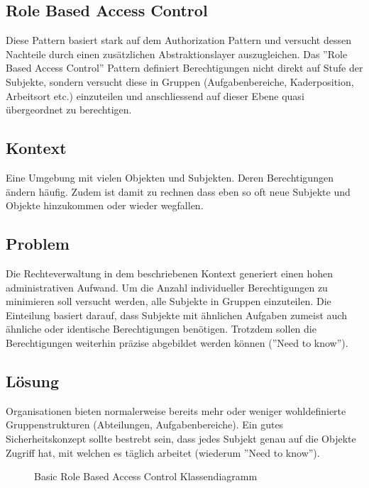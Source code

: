 \subsection{Role Based Access Control}
\label{sec:rbac}

Diese Pattern basiert stark auf dem Authorization Pattern und versucht dessen Nachteile durch einen zusätzlichen Abstraktionslayer auszugleichen.
Das ''Role Based Access Control'' Pattern definiert Berechtigungen nicht direkt auf Stufe der Subjekte, sondern versucht diese in Gruppen (Aufgabenbereiche, Kaderposition, Arbeitsort etc.) einzuteilen und anschliessend auf dieser Ebene quasi übergeordnet zu berechtigen.

\subsection*{Kontext}
Eine Umgebung mit vielen Objekten und Subjekten. Deren Berechtigungen ändern häufig. Zudem ist damit zu rechnen dass eben so oft neue Subjekte und Objekte hinzukommen oder wieder wegfallen.

\subsection*{Problem}
Die Rechteverwaltung in dem beschriebenen Kontext generiert einen hohen administrativen Aufwand. Um die Anzahl individueller Berechtigungen zu minimieren soll versucht werden, alle Subjekte in Gruppen einzuteilen. Die Einteilung basiert darauf, dass Subjekte mit ähnlichen Aufgaben zumeist auch ähnliche oder identische Berechtigungen benötigen.
Trotzdem sollen die Berechtigungen weiterhin präzise abgebildet werden können (''Need to know'').

\subsection*{Lösung}
Organisationen bieten normalerweise bereits mehr oder weniger wohldefinierte Gruppenstrukturen (Abteilungen, Aufgabenbereiche).
Ein gutes Sicherheitskonzept sollte bestrebt sein, dass jedes Subjekt genau auf die Objekte Zugriff hat, mit welchen es täglich arbeitet (wiederum ''Need to know'').

\begin{figure}[H]
	\begin{center}
	\end{center}
	\caption{Basic Role Based Access Control Klassendiagramm}
\end{figure}

